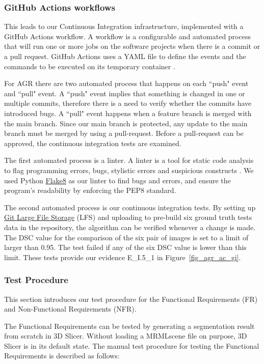 \subsubsection{GitHub Actions workflows}\label{ci}
This leads to our Continuous Integration infrastructure, implemented with a GitHub Actions workflow. A workflow is a configurable and automated process that will run one or more jobs on the software projects when there is a commit or a pull request. GitHub Actions uses a YAML file to define the events and the commands to be executed on its temporary container \cite{GitHubActions}.

For AGR there are two automated process that happens on each ``push" event and ``pull" event. A ``push" event implies that something is changed in one or multiple commits, therefore there is a need to verify whether the commits have introduced bugs. A ``pull" event happens when a feature branch is merged with the main branch. Since our main branch is protected, any update to the main branch must be merged by using a pull-request. Before a pull-request can be approved, the continuous integration tests are examined. 

The first automated process is a linter. A linter is a tool for static code analysis to flag programming errors, bugs, stylistic errors and suspicious constructs  \cite{Linter}. We used Python \href{https://flake8.pycqa.org/en/latest/index.html#}{Flake8} as our linter to find bugs and errors, and ensure the program's readability by enforcing the PEP8 standard.

The second automated process is our continuous integration tests. By setting up \href{https://git-lfs.com/}{Git Large File Storage} (LFS) and uploading to pre-build six ground truth tests data in the repository, the algorithm can be verified whenever a change is made. The DSC value for the comparison of the six pair of images is set to a limit of larger than 0.95. The test failed if any of the six DSC value is lower than this limit. These tests provide our evidence E\_I.5\_1 in Figure~\ref{fig_agr_ac_gi}.

\subsubsection{Test Procedure}

This section introduces our test procedure for the Functional Requirements (FR) and Non-Functional Requirements (NFR).

The Functional Requirements can be tested by generating a segmentation result from scratch in 3D Slicer. Without loading a MRMLscene file on purpose, 3D Slicer is in its default state. The manual test procedure for testing the Functional Requirements is described as follows:

